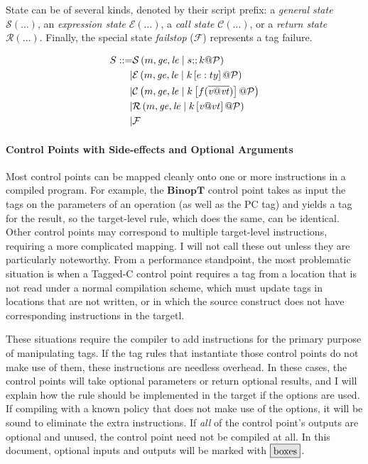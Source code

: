 \documentclass{article}
\begin{document}
State can be of several kinds, denoted by their script prefix: a {\em general state} \(\mathcal{S}(\dots)\),
an {\em expression state} \(\mathcal{E}(\dots)\), a {\em call state} \(\mathcal{C}(\dots)\), or a
{\em return state} \(\mathcal{R}(\dots)\). Finally, the special state {\em failstop} (\(\mathcal{F}\))
represents a tag failure.

\[\begin{aligned}
S ::= & \mathcal{S}\left(m,\mathit{ge},\mathit{le} \mid s ;\!; k @ \mathcal{P}\right) \\
| & \mathcal{E}\left(m,\mathit{ge},\mathit{le} \mid k \left[e : ty\right] @ \mathcal{P}\right) \\
| & \mathcal{C}\left(m,\mathit{ge},\mathit{le} \mid k \left[f(\overline{\mathit{v} @ \mathit{vt}})\right] @ \mathcal{P}\right) \\
| & \mathcal{R}\left(m,\mathit{ge},\mathit{le} \mid k \left[\mathit{v} @ vt\right] @ \mathcal{P}\right) \\
| & \mathcal{F} \\
\end{aligned}\]

\paragraph*{Control Points with Side-effects and Optional Arguments}

Most control points can be mapped cleanly onto one or more instructions in a compiled
program. For example, the \(\mathbf{BinopT}\) control point takes as input the tags on the parameters
of an operation (as well as the PC tag) and yields a tag for the result, so the target-level
rule, which does the same, can be identical. Other control points may correspond to multiple
target-level instructions, requiring a more complicated mapping. I will not call these out
unless they are particularly noteworthy. From a performance standpoint, the most problematic
situation is when a Tagged-C control point requires a tag from a location that is not read under
a normal compilation scheme, which must update tags in locations that are not written, or in which
the source construct does not have corresponding instructions in the targetl.

These situations require the compiler to add instructions for the primary purpose of manipulating
tags. If the tag rules that instantiate those control points do not make use of them, these instructions
are needless overhead. In these cases, the control points will take optional parameters or return
optional results, and I will explain how the rule should be implemented in the target if the
options are used. If compiling with a known policy that does not make use of the options, it will
be sound to eliminate the extra instructions. If {\it all} of the control point's outputs are
optional and unused, the control point need not be compiled at all. In this document, optional inputs
and outputs will be marked with \(\optional{boxes}\).
\end{document}
